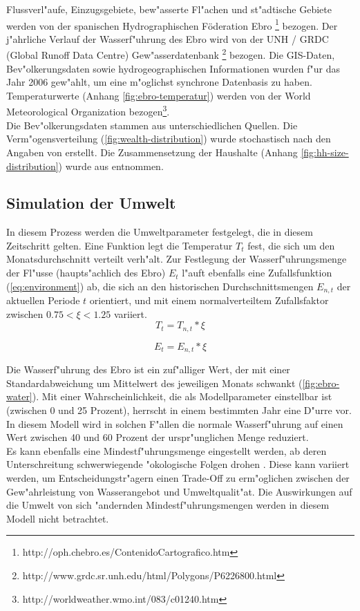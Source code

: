\documentclass[11pt,a4paper]{article}
\begin{document}
Flussverl"aufe, Einzugsgebiete, bew"asserte Fl"achen und st"adtische Gebiete werden von der spanischen Hydrographischen Föderation Ebro \footnote{http://oph.chebro.es/ContenidoCartografico.htm} bezogen. Der j"ahrliche Verlauf der Wasserf"uhrung des Ebro wird von der UNH / GRDC (Global Runoff Data Centre) Gew"asserdatenbank \footnote{http://www.grdc.sr.unh.edu/html/Polygons/P6226800.html} bezogen. Die GIS-Daten, Bev"olkerungsdaten sowie hydrogeographischen Informationen wurden f"ur das Jahr 2006 gew"ahlt, um eine m"oglichst synchrone Datenbasis zu haben. Temperaturwerte (Anhang \ref{fig:ebro-temperatur}) werden von der World Meteorological Organization bezogen\footnote{http://worldweather.wmo.int/083/c01240.htm}.\\
Die Bev"olkerungsdaten stammen aus unterschiedlichen Quellen. Die Ver\-m"o\-gens\-ver\-teilung (\ref{fig:wealth-distribution}) wurde stochastisch nach den Angaben von \cite{Arbues2010} erstellt. Die Zusammensetzung der Haushalte (Anhang \ref{fig:hh-size-distribution}) wurde aus \cite{Barberan2007} entnommen.


\subsection{Simulation der Umwelt}\label{sec:Umweltfunktion}

In diesem Prozess werden die Umweltparameter festgelegt, die in diesem Zeitschritt gelten. Eine Funktion legt die Temperatur $T_{t}$ fest, die sich um den Monatsdurchschnitt verteilt verh"alt. Zur Festlegung der Wasserf"uhrungsmenge der Fl"usse (haupts"achlich des Ebro) $E_{t}$ l"auft ebenfalls eine Zufallsfunktion (\ref{eq:environment}) ab, die sich an den historischen Durchschnittsmengen $E_{n,t}$ der aktuellen Periode $t$ orientiert, und mit einem normalverteiltem Zufallsfaktor zwischen $0.75 < \xi < 1.25$ variiert. \\

\begin{dmath}
T_{t} = T_{n,t} * \xi
\label{eq:temperature}
\end{dmath}


\begin{dmath}
E_{t} = E_{n,t} * \xi
\label{eq:environment}
\end{dmath}

Die Wasserf"uhrung des Ebro ist ein zuf"alliger Wert, der mit einer Standardabweichung um Mittelwert des jeweiligen Monats schwankt (\ref{fig:ebro-water}). Mit einer Wahrscheinlichkeit, die als Modellparameter einstellbar ist (zwischen 0 und 25 Prozent), herrscht in einem bestimmten Jahr eine D"urre vor. In diesem Modell wird in solchen F"allen die normale Wasserf"uhrung auf einen Wert zwischen 40 und 60 Prozent der urspr"unglichen Menge reduziert.\\
Es kann ebenfalls eine Mindestf"uhrungsmenge eingestellt werden, ab deren Unterschreitung schwerwiegende "okologische Folgen drohen \citep{Alcacer2005}. Diese kann variiert werden, um Entscheidungstr"agern einen Trade-Off zu erm"oglichen zwischen der Gew"ahrleistung von Wasserangebot und Umweltqualit"at. Die Auswirkungen auf die Umwelt von sich "andernden Mindestf"uhrungsmengen werden in diesem Modell nicht betrachtet.
\end{document}
